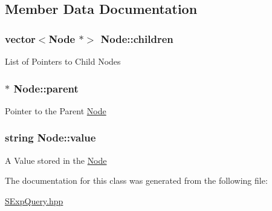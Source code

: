 \subsection{Member Data Documentation}
\hypertarget{class_node_a4403c570a373595bc3f82a8ca0bd2e61}{
\subsubsection[{children}]{\setlength{\rightskip}{0pt plus 5cm}vector$<${\bf Node} $\ast$$>$ Node\-::children}}\label{class_node_a4403c570a373595bc3f82a8ca0bd2e61}
List of Pointers to Child Nodes \hypertarget{class_node_ad8184598cdea70e4bbdfd76f2b0f9e85}{
\subsubsection[{parent}]{$\ast$ Node\-::parent}}\label{class_node_ad8184598cdea70e4bbdfd76f2b0f9e85}
Pointer to the Parent \hyperlink{class_node}{Node} \hypertarget{class_node_afbfe6bbcc5e6d53bb23ff4c29c178596}{
\subsubsection[{value}]{\setlength{\rightskip}{0pt plus 5cm}string Node\-::value}}\label{class_node_afbfe6bbcc5e6d53bb23ff4c29c178596}
A Value stored in the \hyperlink{class_node}{Node} 

The documentation for this class was generated from the following file\-:\begin{DoxyCompactItemize}
\item 
\hyperlink{_s_exp_query_8hpp}{S\-Exp\-Query.\-hpp}\end{DoxyCompactItemize}
